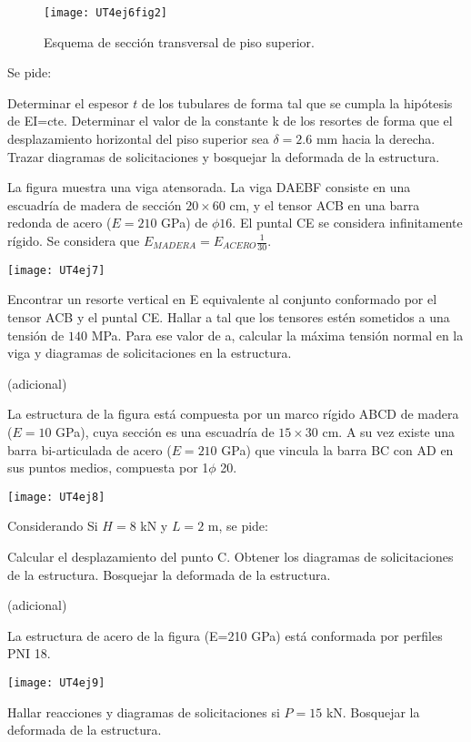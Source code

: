 \begin{figure}[htb]
	\centering
	\texttt{[image: UT4ej6fig2]}
	\caption{Esquema de sección transversal de piso superior.}
	\label{fig62}
\end{figure}
%

Se pide:

\parte Determinar el espesor $t$ de los tubulares de forma tal que se cumpla la hipótesis de EI=cte.
\parte Determinar el valor de la constante k de los resortes de forma que el desplazamiento horizontal del piso superior sea $\delta =2.6$ mm hacia la derecha.
\parte Trazar diagramas de solicitaciones y bosquejar la deformada de la estructura.



\ejercicio

La figura muestra una viga atensorada. La viga DAEBF consiste en una escuadría de madera de sección $20 \times 60$ cm, y el tensor ACB en una barra redonda de acero ($E=210$ GPa) de $\phi 16$. %
%
El puntal CE se considera infinitamente rígido. Se considera que $ E_{MADERA} = E_{ACERO} \frac{1}{30}$.

\begin{center}
	\texttt{[image: UT4ej7]}
\end{center}

\parte Encontrar un resorte vertical en E equivalente al conjunto conformado por el tensor ACB y el puntal CE.
\parte Hallar  a tal que  los tensores estén sometidos a una tensión de $140$ MPa.
\parte Para ese valor de a, calcular la máxima tensión normal en la viga y diagramas de solicitaciones en la estructura.


\ejercicio (adicional) 

La estructura de la figura está compuesta por un marco rígido ABCD de madera ($E=10$ GPa), cuya sección es una escuadría de $15 \times 30$ cm. A su vez existe una barra bi-articulada de acero ($E=210$ GPa) que vincula la barra BC con AD en sus puntos medios, compuesta por 1$\phi$ 20.

\begin{center}
	\texttt{[image: UT4ej8]}
\end{center}

Considerando Si $H=8$ kN y $L=2$ m, se pide:

\parte Calcular el desplazamiento del punto C.
\parte Obtener los diagramas de solicitaciones de la estructura.
\parte Bosquejar la deformada de la estructura.

\ejercicio (adicional) 

La estructura de acero de la figura (E=210 GPa) está conformada por perfiles PNI 18. 

\begin{center}
	\texttt{[image: UT4ej9]}
\end{center}

\parte Hallar reacciones y diagramas de solicitaciones si $P=15$ kN. 
\parte Bosquejar la deformada de la estructura.



